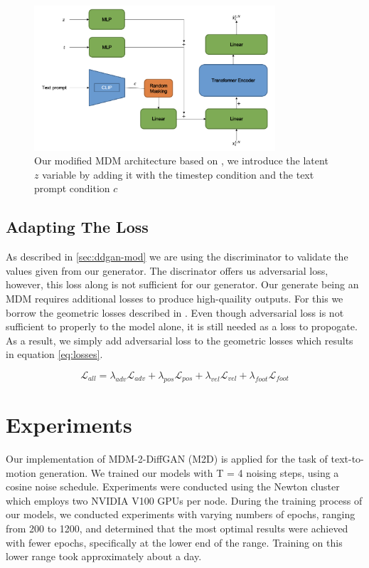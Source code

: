\documentclass[10pt,twocolumn,letterpaper]{article}
\begin{document}
\begin{figure}[h!t]
	\centering
	\includegraphics[width=0.8\textwidth]{imgs/modified-MDM.png}
	\caption{Our modified MDM architecture based on \cite{Tevet23}, we introduce the latent $z$ variable by adding it with the timestep condition and the text prompt condition $c$}
	\label{fig:modified-mdm]}
\end{figure}

\subsection{Adapting The Loss}

As described in \ref{sec:ddgan-mod} we are using the discriminator to validate the values given from our generator. The discrinator offers us adversarial loss, however, this loss along is not sufficient for our generator. Our generate being an MDM requires additional losses to produce high-quaility outputs. For this we borrow the geometric losses described in \cite{Tevet23}. Even though adversarial loss is not sufficient to properly to the model alone, it is still needed as a loss to propogate. As a result, we simply add adversarial loss to the geometric losses which results in equation \ref{eq:losses}.

\begin{equation}\label{eq:losses}
	\mathcal{L}_{all} = \lambda_{adv}\mathcal{L}_{adv} + \lambda_{pos}\mathcal{L}_{pos} + \lambda_{vel}\mathcal{L}_{vel} + \lambda_{foot}\mathcal{L}_{foot} 
\end{equation}

\section{Experiments}
\label{sec:experiments}
Our implementation of MDM-2-DiffGAN (M2D) is applied for the task of text-to-motion generation. We trained our models with T = 4 noising steps, 
using a cosine noise schedule. Experiments were conducted using the Newton cluster which employs two NVIDIA V100 GPUs per node. During the 
training process of our models, we conducted experiments with varying numbers of epochs, ranging from 200 to 1200, and determined that the 
most optimal results were achieved with fewer epochs, specifically at the lower end of the range. Training on this lower range took approximately
about a day.
\\
\end{document}
